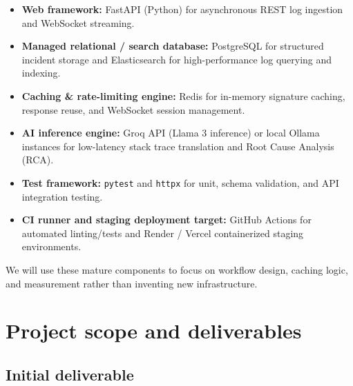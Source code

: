 \documentclass[11pt,a4paper]{article}
\begin{document}
\begin{itemize}[leftmargin=0.7cm]

\item \textbf{Web framework:} FastAPI (Python) for asynchronous REST log ingestion and WebSocket streaming.

\item \textbf{Managed relational / search database:} PostgreSQL for structured incident storage and Elasticsearch for high-performance log querying and indexing.

\item \textbf{Caching \& rate-limiting engine:} Redis for in-memory signature caching, response reuse, and WebSocket session management.

\item \textbf{AI inference engine:} Groq API (Llama 3 inference) or local Ollama instances for low-latency stack trace translation and Root Cause Analysis (RCA).

\item \textbf{Test framework:} \texttt{pytest} and \texttt{httpx} for unit, schema validation, and API integration testing.

\item \textbf{CI runner and staging deployment target:} GitHub Actions for automated linting/tests and Render / Vercel containerized staging environments.

\end{itemize}

We will use these mature components to focus on workflow design, caching logic, and measurement rather than inventing new infrastructure.


\section{Project scope and deliverables}

\subsection{Initial deliverable}
\end{document}
